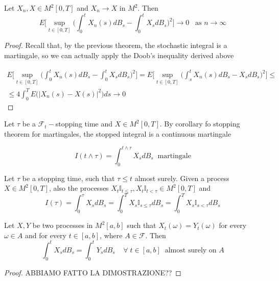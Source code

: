 \begin{theorem}
    Let $X_n,X \in M^2[0,T]$ and $X_n \to X$ in $M^2$. Then
    \begin{equation*}
        E\Bigg[ \sup_{t \in [0,T]} \Bigg( \int_0^t X_n(s) dB_s - \int_0^t X_s dB_s \Bigg)^2 \Bigg] \to 0 \;\;\; \text{as $n\to \infty$}
    \end{equation*}
\end{theorem}
\begin{proof}
    Recall that, by the previous theorem, the stochastic integral is a martingale, so we can actually apply the Doob's inequality derived above

    \begin{gather*}
        E\Bigg[ \sup_{t \in [0,T]} \Bigg( \int_0^t X_n(s) dB_s - \int_0^t X_s dB_s \Bigg)^2 \Bigg] = E\Bigg[ \sup_{t \in [0,T]} \Bigg( \int_s^t X_n(s) dB_s -X_s dB_s \Bigg)^2 \Bigg] \leq \\
        \leq 4 \int_0^T E\Big(\vert X_n(s) - X(s) \vert^2\Big) ds \to 0  
    \end{gather*}
\end{proof}

Let $\tau$ be a $\mathcal{F}_t-$stopping time and $X \in M^2[0,T]$. By corollary fo stopping theorem for martingales, the stopped integral is a continuous martingale

\begin{equation*}
    I(t \wedge \tau) = \int_0^{t \wedge \tau} X_s dB_s \;\; \text{martingale} 
\end{equation*}

\begin{theorem}
    Let $\tau$ be a stopping time, such that $\tau \leq t$ almost surely. Given a process $X \in M^2[0,T]$, also the processes $X_t \mathbb{I}_{t \leq \tau}, X_t \mathbb{I}_{t < \tau} \in M^2[0,T]$ and
    \begin{equation*}
        I(\tau) = \int_0^{\tau} X_s dB_s = \int_0^T X_s \mathbb{I}_{s \leq \tau} dB_s = \int_0^T X_s \mathbb{I}_{s < \tau} dB_s
    \end{equation*}
\end{theorem}

\begin{theorem}
    Let $X,Y$ be two processes in $M^2[a,b]$ such that
    $X_t(\omega) = Y_t(\omega)$ for every $\omega \in A$ and for every $t \in [a,b]$, where $A \in \mathcal{F}$. Then
    \begin{equation*}
        \int_0^t X_s dB_s = \int_0^t Y_s dB_s \;\; \;   \; \forall \; t \in [a,b] \;\; \text{almost surely on $A$}
    \end{equation*}
\end{theorem}
\begin{proof}
    ABBIAMO FATTO LA DIMOSTRAZIONE??
\end{proof}

